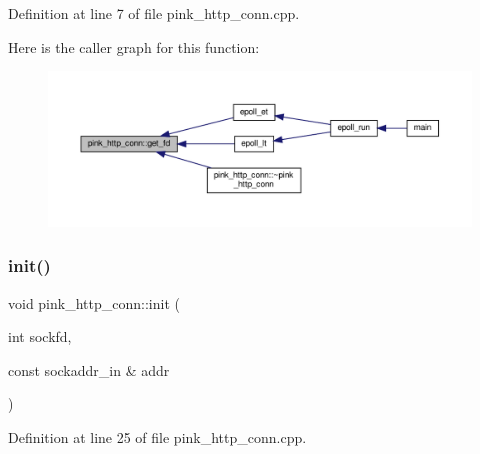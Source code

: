 Definition at line 7 of file pink\+\_\+http\+\_\+conn.\+cpp.

Here is the caller graph for this function\+:\nopagebreak
\begin{figure}[H]
\begin{center}
\leavevmode
\includegraphics[width=350pt]{classpink__http__conn_aa304899ec9a7f6d7a2a9d738309a9570_icgraph}
\end{center}
\end{figure}
\mbox{\label{classpink__http__conn_abff27697496d209cdc7375f99117f018}} 
\subsubsection{\texorpdfstring{init()}{init()}}
{\footnotesize\ttfamily void pink\+\_\+http\+\_\+conn\+::init (\begin{DoxyParamCaption}\item[{int}]{sockfd,  }\item[{const sockaddr\+\_\+in \&}]{addr }\end{DoxyParamCaption})}



Definition at line 25 of file pink\+\_\+http\+\_\+conn.\+cpp.

